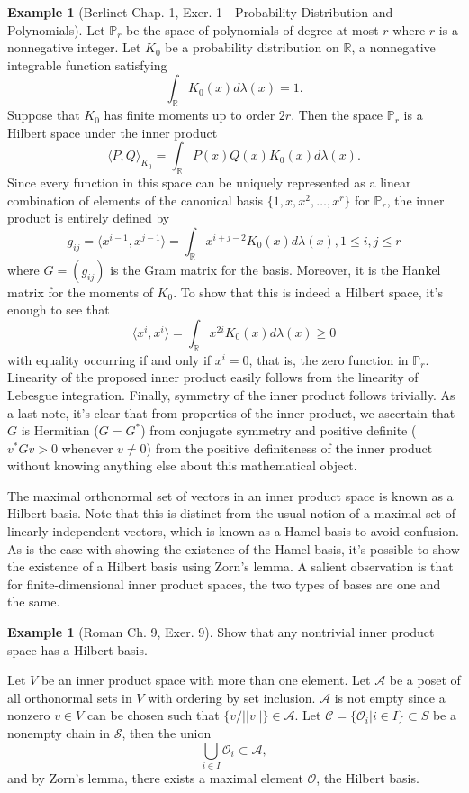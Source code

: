 \documentclass{article}
\theoremstyle{definition}
\newtheorem{exmp}[thm]{Example}
\theoremstyle{remark}
\numberwithin{equation}{section}
\begin{document}
\begin{exmp} [Berlinet Chap. 1, Exer. 1 - Probability Distribution and Polynomials]
Let $\mathbb{P}_r$ be the space of polynomials of degree at most $r$ where $r$ is a nonnegative integer. Let $K_0$ be a probability distribution on $\mathbb{R}$, a nonnegative integrable function satisfying 
$$\int _{\mathbb{R}} K_0(x) d \lambda (x) = 1.$$
Suppose that $K_0$ has finite moments up to order $2r$. Then the space $\mathbb{P}_r$ is a Hilbert space under the inner product 
$$\langle P, Q \rangle _{K_0} = \int _{\mathbb{R}} P(x)Q(x)K_0(x) d\lambda (x). $$
Since every function in this space can be uniquely represented as a linear combination of elements of the canonical basis $\{ 1, x, x^2 , \dots, x^r \}$ for $\mathbb{P}_r$, the inner product is entirely defined by 
$$g_{ij} = \langle x^{i-1} , x^{j-1} \rangle = \int _{\mathbb{R}} x^{i+j-2} K_0 (x) d\lambda (x), 1 \leq i, j \leq r$$
where $G= (g_{ij})$ is the Gram matrix for the basis. Moreover, it is the Hankel matrix for the moments of $K_0$. To show that this is indeed a Hilbert space, it's enough to see that 
$$\langle x^i , x^i \rangle = \int _{\mathbb{R}} x^{2i} K_0 (x) d\lambda (x) \geq 0 $$
with equality occurring if and only if $x^i = 0$, that is, the zero function in $\mathbb{P}_r$. Linearity of the proposed inner product easily follows from the linearity of Lebesgue integration. Finally, symmetry of the inner product follows trivially. As a last note, it's clear that from properties of the inner product, we ascertain that $G$ is Hermitian ($G = G^*$) from conjugate symmetry and positive definite ($v^*Gv > 0$ whenever $v \neq 0$) from the positive definiteness of the inner product without knowing anything else about this mathematical object.
\end{exmp}
The maximal orthonormal set of vectors in an inner product space is known as a Hilbert basis. Note that this is distinct from the usual notion of a maximal set of linearly independent vectors, which is known as a Hamel basis to avoid confusion. As is the case with showing the existence of the Hamel basis, it's possible to show the existence of a Hilbert basis using Zorn's lemma. A salient observation is that for finite-dimensional inner product spaces, the two types of bases are one and the same. 

\begin{exmp}[Roman Ch. 9, Exer. 9] Show that any nontrivial inner product space has a Hilbert basis. 

Let $V$ be an inner product space with more than one element. Let $\mathcal{A}$ be a poset of all orthonormal sets in $V$ with ordering by set inclusion. $\mathcal{A}$ is not empty since a nonzero $v \in V$ can be chosen such that $\{ v / || v|| \} \in \mathcal{A}.$ Let $\mathcal{C} = \{ \mathcal{O}_i | i \in I \} \subset S$ be a nonempty chain in $\mathcal{S}$, then the union
$$\bigcup _{i \in I} \mathcal{O} _i \subset \mathcal{A}, $$
and by Zorn's lemma, there exists a maximal element $\mathcal{O}$, the Hilbert basis. 
\end{exmp}
\end{document}
